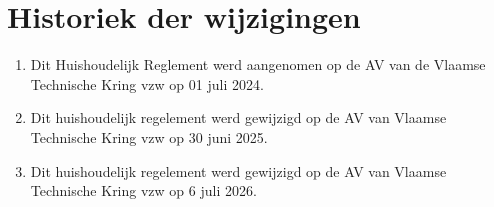 \section{Historiek der wijzigingen}
\begin{enumerate}
    \item Dit Huishoudelijk Reglement werd aangenomen op de AV van de Vlaamse Technische Kring vzw op 01 juli 2024.
    \item Dit huishoudelijk regelement werd gewijzigd op de AV van Vlaamse Technische Kring vzw op 30 juni 2025.
    \item Dit huishoudelijk regelement werd gewijzigd op de AV van Vlaamse Technische Kring vzw op 6 juli 2026.
\end{enumerate}


